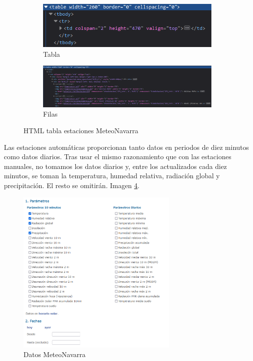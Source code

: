 \begin{figure} [H]
	\centering
	\begin{subfigure}{.5\textwidth}
		\centering
		\includegraphics[width=.7\linewidth]{fig/MeteoNavarraCodeHTMLTable.png}
		\caption{Tabla}
		\label{fig:sub5}
	\end{subfigure}%
	\begin{subfigure}{.5\textwidth}
		\centering
		\includegraphics[width=.7\linewidth]{fig/MeteoNavarraCodeHTML.png}
		\caption{Filas}
		\label{fig:sub6}
	\end{subfigure}
	\caption{HTML tabla estaciones MeteoNavarra}
	\label{fig:ej28}
\end{figure}

Las estaciones automáticas proporcionan tanto datos en periodos de diez minutos como datos diarios. Tras usar el mismo razonamiento que con las estaciones manuales, no tomamos los datos diarios y, entre los actualizados cada diez minutos, se toman la temperatura, humedad relativa, radiación global y precipitación. El resto se omitirán. Imagen \ref{fig:ej6}.

\begin{figure} [H]
	\centering
	\includegraphics[width=0.7\textwidth]{fig/DatosMeteoNavarra.png}
	\caption[Apartado selección de datos MeteoNavarra]{Datos MeteoNavarra}
	\label{fig:ej6}
\end{figure}

